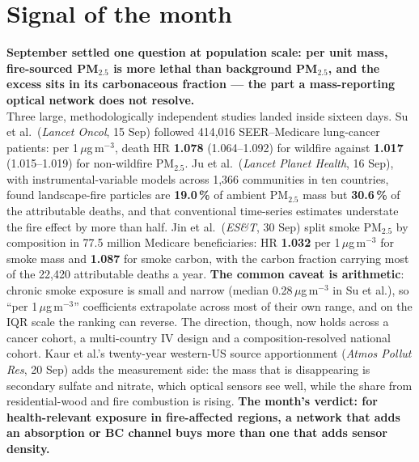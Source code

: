 \documentclass[10pt]{article}
\begin{document}
\vspace{6mm}

\section*{\sffamily\bfseries\color{Deep}Signal of the month}
\vspace{-1.5mm}{\color{Coral}\rule{\linewidth}{1.1pt}}\vspace{2.5mm}

\begin{keybox}
{\sffamily\bfseries\small\color{Deep}September settled one question at population scale: per
unit mass, fire-sourced PM$_{2.5}$ is more lethal than background PM$_{2.5}$, and the excess sits
in its carbonaceous fraction --- the part a mass-reporting optical network does not resolve.}\\[1.4mm]
\footnotesize
Three large, methodologically independent studies landed inside sixteen days. Su et al.\
(\textit{Lancet Oncol}, 15 Sep) followed 414,016 SEER--Medicare lung-cancer patients: per
1\,$\mu$g\,m$^{-3}$, death HR \textbf{1.078} (1.064--1.092) for wildfire against \textbf{1.017}
(1.015--1.019) for non-wildfire PM$_{2.5}$. Ju et al.\ (\textit{Lancet Planet Health}, 16 Sep), with
instrumental-variable models across 1,366 communities in ten countries, found landscape-fire
particles are \textbf{19.0\,\%} of ambient PM$_{2.5}$ mass but \textbf{30.6\,\%} of the attributable deaths,
and that conventional time-series estimates understate the fire effect by more than half. Jin et
al.\ (\textit{ES\&T}, 30 Sep) split smoke PM$_{2.5}$ by composition in 77.5 million Medicare
beneficiaries: HR \textbf{1.032} per 1\,$\mu$g\,m$^{-3}$ for smoke mass and \textbf{1.087} for smoke carbon,
with the carbon fraction carrying most of the 22,420 attributable deaths a year.
\textbf{The common caveat is arithmetic}: chronic smoke exposure is small and narrow (median
0.28\,$\mu$g\,m$^{-3}$ in Su et al.), so ``per 1\,$\mu$g\,m$^{-3}$'' coefficients extrapolate across most
of their own range, and on the IQR scale the ranking can reverse. The direction, though, now holds
across a cancer cohort, a multi-country IV design and a composition-resolved national cohort.
Kaur et al.'s twenty-year western-US source apportionment (\textit{Atmos Pollut Res}, 20 Sep) adds
the measurement side: the mass that is disappearing is secondary sulfate and nitrate, which
optical sensors see well, while the share from residential-wood and fire combustion is rising.
\textbf{The month's verdict: for health-relevant exposure in fire-affected regions, a network
that adds an absorption or BC channel buys more than one that adds sensor density.}
\end{keybox}
\end{document}
